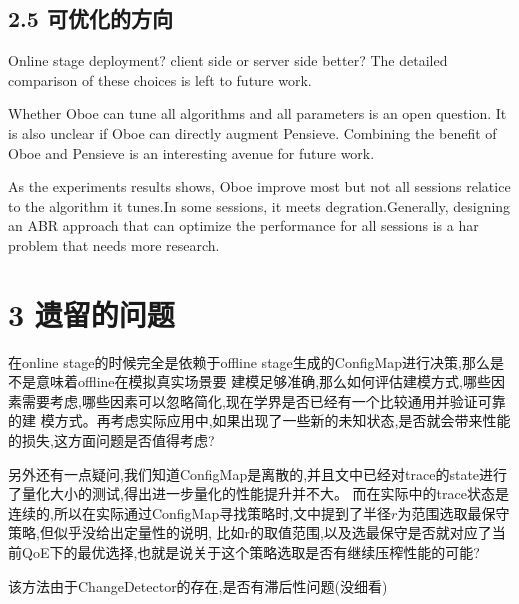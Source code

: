 \documentclass{\SetClass}
\begin{document}
    \subsection*{2.5 可优化的方向}
    \par Online stage deployment? client side or server side better? The detailed comparison of these choices 
    is left to future work. 

    \par Whether Oboe can tune all algorithms and all parameters is an open question. 
    It is also unclear if Oboe can directly augment Pensieve. Combining the benefit of 
    Oboe and Pensieve is an interesting avenue for future work.

    \par As the experiments results shows, Oboe improve most but not all sessions relatice to the
    algorithm it tunes.In some sessions, it meets degration.Generally, designing an ABR approach that
    can optimize the performance for all sessions is a har problem that needs more research.

    \section*{3 遗留的问题}
    \par 在online stage的时候完全是依赖于offline stage生成的ConfigMap进行决策,那么是不是意味着offline在模拟真实场景要
    建模足够准确,那么如何评估建模方式,哪些因素需要考虑,哪些因素可以忽略简化,现在学界是否已经有一个比较通用并验证可靠的建
    模方式。再考虑实际应用中,如果出现了一些新的未知状态,是否就会带来性能的损失,这方面问题是否值得考虑?

    \par 另外还有一点疑问,我们知道ConfigMap是离散的,并且文中已经对trace的state进行了量化大小的测试,得出进一步量化的性能提升并不大。
    而在实际中的trace状态是连续的,所以在实际通过ConfigMap寻找策略时,文中提到了半径$r$为范围选取最保守策略,但似乎没给出定量性的说明,
    比如r的取值范围,以及选最保守是否就对应了当前QoE下的最优选择,也就是说关于这个策略选取是否有继续压榨性能的可能?

    \par 该方法由于ChangeDetector的存在,是否有滞后性问题(没细看)
\end{document}

